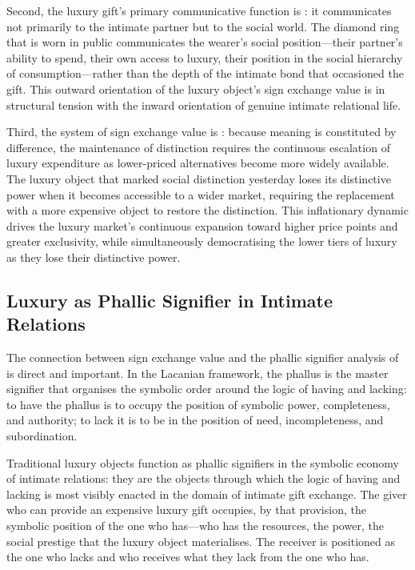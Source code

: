 Second, the luxury gift's primary communicative function is : it communicates not primarily to the intimate partner but to the social world. The diamond ring that is worn in public communicates the wearer's social position---their partner's ability to spend, their own access to luxury, their position in the social hierarchy of consumption---rather than the depth of the intimate bond that occasioned the gift. This outward orientation of the luxury object's sign exchange value is in structural tension with the inward orientation of genuine intimate relational life.

Third, the system of sign exchange value is : because meaning is constituted by difference, the maintenance of distinction requires the continuous escalation of luxury expenditure as lower-priced alternatives become more widely available. The luxury object that marked social distinction yesterday loses its distinctive power when it becomes accessible to a wider market, requiring the replacement with a more expensive object to restore the distinction. This inflationary dynamic drives the luxury market's continuous expansion toward higher price points and greater exclusivity, while simultaneously democratising the lower tiers of luxury as they lose their distinctive power.

\subsection{Luxury as Phallic Signifier in Intimate Relations}
\label{p16:subsec:phallic}

\noindent
The connection between sign exchange value and the phallic signifier analysis of  \parencite{paperxv} is direct and important. In the Lacanian framework, the phallus is the master signifier that organises the symbolic order around the logic of having and lacking: to have the phallus is to occupy the position of symbolic power, completeness, and authority; to lack it is to be in the position of need, incompleteness, and subordination.

Traditional luxury objects function as phallic signifiers in the symbolic economy of intimate relations: they are the objects through which the logic of having and lacking is most visibly enacted in the domain of intimate gift exchange. The giver who can provide an expensive luxury gift occupies, by that provision, the symbolic position of the one who has---who has the resources, the power, the social prestige that the luxury object materialises. The receiver is positioned as the one who lacks and who receives what they lack from the one who has.

